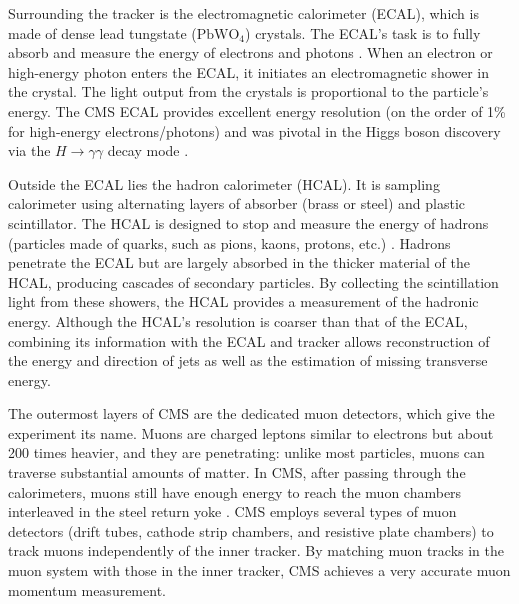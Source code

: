 Surrounding the tracker is the electromagnetic calorimeter (ECAL), which is made of dense lead tungstate ($\text{PbWO}_4$) crystals. The ECAL’s task is to fully absorb and measure the energy of electrons and photons \cite{CMS}. When an electron or high-energy photon enters the ECAL, it initiates an electromagnetic shower in the crystal. The light output from the crystals is proportional to the particle’s energy. The CMS ECAL provides excellent energy resolution (on the order of 1\% for high-energy electrons/photons) and was pivotal in the Higgs boson discovery via the $H\to\gamma\gamma$ decay mode \cite{Chatrchyan_2012}.

Outside the ECAL lies the hadron calorimeter (HCAL). It is sampling calorimeter using alternating layers of absorber (brass or steel) and plastic scintillator. The HCAL is designed to stop and measure the energy of hadrons (particles made of quarks, such as pions, kaons, protons, etc.) \cite{CMS}. Hadrons penetrate the ECAL but are largely absorbed in the thicker material of the HCAL, producing cascades of secondary particles. By collecting the scintillation light from these showers, the HCAL provides a measurement of the hadronic energy. Although the HCAL’s resolution is coarser than that of the ECAL, combining its information with the ECAL and tracker allows reconstruction of the energy and direction of jets as well as the estimation of missing transverse energy.

The outermost layers of CMS are the dedicated muon detectors, which give the experiment its name. Muons are charged leptons similar to electrons but about 200 times heavier, and they are penetrating: unlike most particles, muons can traverse substantial amounts of matter. In CMS, after passing through the calorimeters, muons still have enough energy to reach the muon chambers interleaved in the steel return yoke \cite{CMS}. CMS employs several types of muon detectors (drift tubes, cathode strip chambers, and resistive plate chambers) to track muons independently of the inner tracker. By matching muon tracks in the muon system with those in the inner tracker, CMS achieves a very accurate muon momentum measurement.

